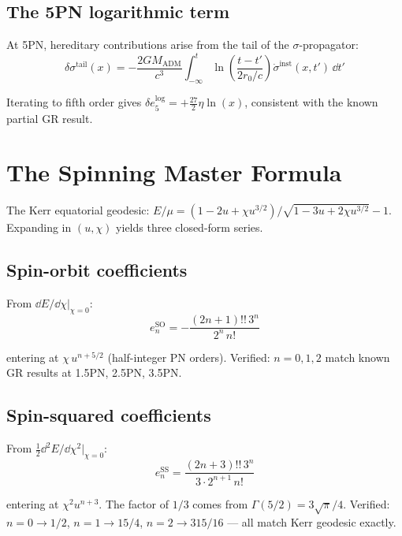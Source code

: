 \documentclass[11pt,a4paper]{article}
\theoremstyle{plain}
\theoremstyle{definition}
\theoremstyle{remark}
\begin{document}
\subsection{The 5PN logarithmic term}

At 5PN, hereditary contributions arise from the tail of the $\sigma$-propagator:
\begin{equation}
  \delta\sigma^{\mathrm{tail}}(x) = -\frac{2GM_{\mathrm{ADM}}}{c^3}\int_{-\infty}^t\ln\!\left(\frac{t-t'}{2r_0/c}\right)\dot\sigma^{\mathrm{inst}}(x,t')\,\dd t'
\end{equation}

Iterating to fifth order gives $\delta e_5^{\mathrm{log}} = +\tfrac{27}{2}\eta\ln(x)$, consistent with the known partial GR result.

\section{The Spinning Master Formula}
\label{sec:spinning}

The Kerr equatorial geodesic: $E/\mu = (1-2u+\chi u^{3/2})/\sqrt{1-3u+2\chi u^{3/2}} - 1$.  Expanding in $(u, \chi)$ yields three closed-form series.

\subsection{Spin-orbit coefficients}

From $\dd E/\dd\chi|_{\chi=0}$:
\begin{equation}
  \boxed{e_n^{\mathrm{SO}} = -\frac{(2n+1)!!\,3^n}{2^n\,n!}}
\end{equation}

entering at $\chi\,u^{n+5/2}$ (half-integer PN orders).  Verified: $n=0,1,2$ match known GR results at 1.5PN, 2.5PN, 3.5PN.

\subsection{Spin-squared coefficients}

From $\tfrac{1}{2}\dd^2E/\dd\chi^2|_{\chi=0}$:
\begin{equation}
  \boxed{e_n^{\mathrm{SS}} = \frac{(2n+3)!!\,3^n}{3\cdot2^{n+1}\,n!}}
\end{equation}

entering at $\chi^2 u^{n+3}$.  The factor of $1/3$ comes from $\Gamma(5/2) = 3\sqrt{\pi}/4$.  Verified: $n=0\to1/2$, $n=1\to15/4$, $n=2\to315/16$ --- all match Kerr geodesic exactly.
\end{document}
